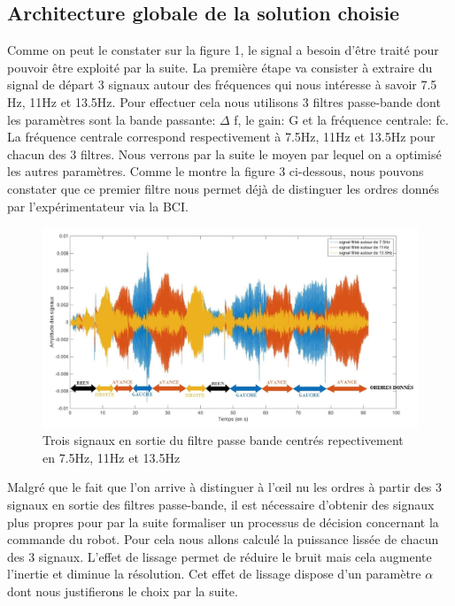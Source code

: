\documentclass[11pt]{article}
\begin{document}
\cleardoublepage


\subsection{Architecture globale de la solution choisie}

Comme on peut le constater sur la figure 1, le signal a besoin d'être traité pour pouvoir être exploité par la suite. La première étape va consister à extraire du signal de départ 3 signaux autour des fréquences qui nous intéresse à savoir 7.5 Hz, 11Hz et 13.5Hz. Pour effectuer cela nous utilisons 3 filtres passe-bande dont les paramètres sont la bande passante: $\Delta$ f, le gain: G et la fréquence centrale: fc. La fréquence centrale correspond respectivement à 7.5Hz, 11Hz et 13.5Hz pour chacun des 3 filtres. Nous verrons par la suite le moyen par lequel on a optimisé les autres paramètres. Comme le montre la figure 3 ci-dessous, nous pouvons constater que ce premier filtre nous permet déjà de distinguer les ordres donnés par l'expérimentateur via la BCI.

\begin{figure}[!h]
	\includegraphics[scale=0.75]{images/Sigauxfiltreslables.jpg}
	\caption{Trois signaux en sortie du filtre passe bande centrés repectivement en 7.5Hz, 11Hz et 13.5Hz}
	\label{fig:duck}
\end{figure}

Malgré que le fait que l'on arrive à distinguer à l'œil nu les ordres à partir des 3 signaux en sortie des filtres passe-bande, il est nécessaire d'obtenir des signaux plus propres pour par la suite formaliser un processus de décision concernant la commande du robot. Pour cela nous allons calculé la puissance lissée de chacun des 3 signaux. L'effet de lissage permet de réduire le bruit mais cela augmente l'inertie et diminue la résolution. Cet effet de lissage dispose d'un paramètre $ \alpha $ dont nous justifierons le choix par la suite.
\end{document}
